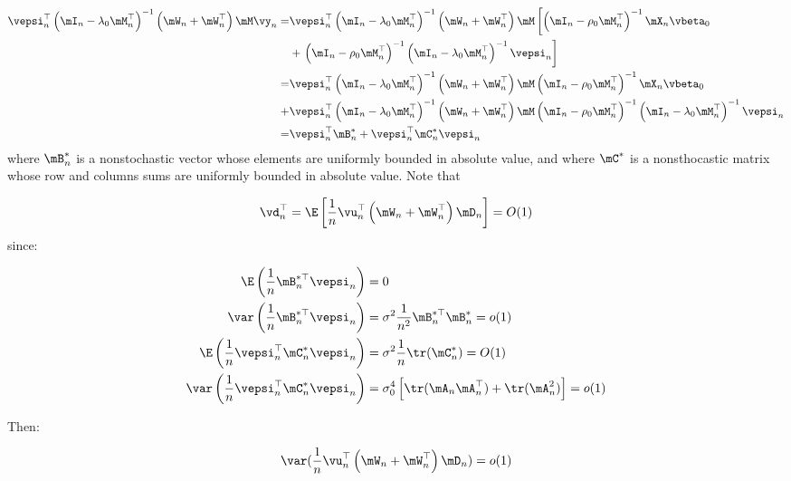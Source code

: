 \documentclass[english,12pt]{book}\usepackage[]{graphicx}\usepackage[]{xcolor}
\begin{document}
\begin{subappendices}
\begin{equation*}
\begin{aligned}
  \vepsi_n^\top\left(\mI_n-\lambda_0\mM_n^\top\right)^{-1}\left(\mW_n + \mW_n^\top\right)\mM\vy_n  = & \vepsi_n^\top\left(\mI_n-\lambda_0\mM_n^\top\right)^{-1}\left(\mW_n + \mW_n^\top\right)\mM\left[\left(\mI_n-\rho_0\mM_n^\top\right)^{-1}\mX_n\vbeta_0 \right. \\
  & + \left.\left(\mI_n-\rho_0\mM_n^\top\right)^{-1}\left(\mI_n-\lambda_0\mM_n^\top\right)^{-1}\vepsi_n\right] \\
= & \vepsi_n^\top\left(\mI_n-\lambda_0\mM_n^\top\right)^{-1}\left(\mW_n + \mW_n^\top\right)\mM\left(\mI_n-\rho_0\mM_n^\top\right)^{-1}\mX_n\vbeta_0 \\
 + & \vepsi_n^\top\left(\mI_n-\lambda_0\mM_n^\top\right)^{-1}\left(\mW_n + \mW_n^\top\right)\mM\left(\mI_n-\rho_0\mM_n^\top\right)^{-1}\left(\mI_n-\lambda_0\mM_n^\top\right)^{-1}\vepsi_n \\
 = & \vepsi_n^\top\mB^*_n + \vepsi_n^\top\mC^*_n\vepsi_n
  \end{aligned}
\end{equation*}
%
where $\mB_n^*$ is a nonstochastic vector whose elements are uniformly bounded in absolute value, and where $\mC^*$ is a nonsthocastic matrix whose row and columns sums are uniformly bounded in absolute value. Note that 

\begin{equation}\label{eq:moran-p4}
\vd_n^\top = \E\left[\frac{1}{n}\vu_n^\top\left(\mW_n + \mW_n^\top\right)\mD_n\right] = O(1)
\end{equation}
%
since:

\begin{equation*}
  \begin{aligned}
    \E\left(\frac{1}{n}\mB^{*\top}_n\vepsi_n\right) &= 0 \\
    \var\left(\frac{1}{n}\mB^{*\top}_n\vepsi_n\right) &= \sigma^2\frac{1}{n^2}\mB^{*\top}_n\mB^{*}_n = o(1) \\
    \E\left(\frac{1}{n}\vepsi_n^\top\mC^*_n\vepsi_n\right) &= \sigma^2\frac{1}{n}\tr(\mC_n^*) = O(1)\\
     \var\left(\frac{1}{n}\vepsi_n^\top\mC^*_n\vepsi_n\right) &= \sigma^4_0\left[\tr(\mA_n\mA_n^\top)+\tr(\mA^2_n)\right] = o(1)
  \end{aligned}
\end{equation*}

Then:

\begin{equation}
  \var(\frac{1}{n}\vu_n^\top\left(\mW_n + \mW_n^\top\right)\mD_n) = o(1)
\end{equation}


\end{subappendices}
\end{document}
